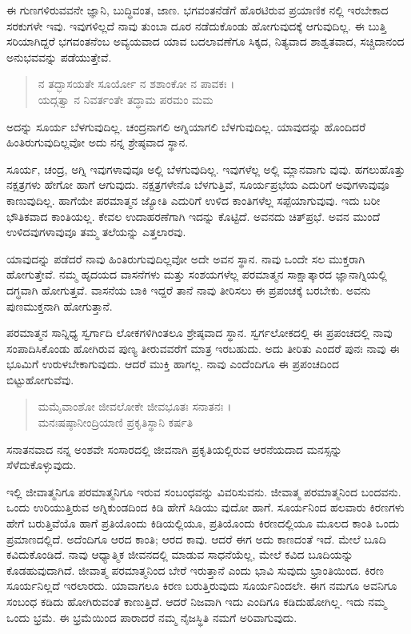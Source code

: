 ಈ ಗುಣಗಳಿರುವವನೇ ಜ್ಞಾನಿ, ಬುದ್ಧಿವಂತ, ಜಾಣ. ಭಗವಂತನೆಡೆಗೆ ಹೊರಟಿರುವ ಪ್ರಯಾಣಿಕ ನಲ್ಲಿ ಇರಬೇಕಾದ ಸರಕುಗಳೇ ಇವು. ಇವುಗಳಿಲ್ಲದೆ ನಾವು ತುಂಬಾ ದೂರ ನಡೆದುಕೊಂಡು ಹೋಗುವುದಕ್ಕೆ ಆಗುವುದಿಲ್ಲ. ಈ ಬುತ್ತಿ ಸರಿಯಾಗಿದ್ದರೆ ಭಗವಂತನೆಂಬ ಅವ್ಯಯವಾದ ಯಾವ ಬದಲಾವಣೆಗೂ ಸಿಕ್ಕದ, ನಿತ್ಯವಾದ ಶಾಶ್ವತವಾದ, ಸಚ್ಚಿದಾನಂದ ಅನುಭವವನ್ನು ಪಡೆಯುತ್ತೇವೆ.

\begin{verse}
ನ ತದ್ಭಾಸಯತೇ ಸೂರ್ಯೋ ನ ಶಶಾಂಕೋ ನ ಪಾವಕಃ ।\\ಯದ್ಗತ್ವಾ ನ ನಿವರ್ತಂತೇ ತದ್ಧಾಮ ಪರಮಂ ಮಮ 
\end{verse}

{\small ಅದನ್ನು ಸೂರ್ಯ ಬೆಳಗುವುದಿಲ್ಲ. ಚಂದ್ರನಾಗಲಿ ಅಗ್ನಿಯಾಗಲಿ ಬೆಳಗುವುದಿಲ್ಲ. ಯಾವುದನ್ನು ಹೊಂದಿದರೆ ಹಿಂತಿರುಗುವುದಿಲ್ಲವೋ ಅದು ನನ್ನ ಶ್ರೇಷ್ಠವಾದ ಸ್ಥಾನ.}

ಸೂರ್ಯ, ಚಂದ್ರ, ಅಗ್ನಿ ಇವುಗಳಾವುವೂ ಅಲ್ಲಿ ಬೆಳಗುವುದಿಲ್ಲ. ಇವುಗಳೆಲ್ಲ ಅಲ್ಲಿ ಮ್ಲಾನವಾಗು ವುವು. ಹಗಲುಹೊತ್ತು ನಕ್ಷತ್ರಗಳು ಹೇಗೋ ಹಾಗೆ ಆಗುವುದು. ನಕ್ಷತ್ರಗಳೇನೊ ಬೆಳಗುತ್ತಿವೆ, ಸೂರ್ಯಪ್ರಭೆಯ ಎದುರಿಗೆ ಅವುಗಳಾವುವೂ ಕಾಣುವುದಿಲ್ಲ. ಹಾಗೆಯೇ ಪರಮಾತ್ಮನ ಜ್ಯೋತಿ ಎದುರಿಗೆ ಉಳಿದ ಕಾಂತಿಗಳೆಲ್ಲ ಸಪ್ಪೆಯಾಗುವುವು. ಇದು ಬರೀ ಭೌತಿಕವಾದ ಕಾಂತಿಯಲ್ಲ. ಕೇವಲ ಉದಾಹರಣೆಗಾಗಿ ಇದನ್ನು ಕೊಟ್ಟಿದೆ. ಅವನದು ಚಿತ್​ಪ್ರಭೆ. ಅವನ ಮುಂದೆ ಉಳಿದವುಗಳಾವುವೂ ತಮ್ಮ ತಲೆಯನ್ನು ಎತ್ತಲಾರವು.

ಯಾವುದನ್ನು ಪಡೆದರೆ ನಾವು ಹಿಂತಿರುಗುವುದಿಲ್ಲವೋ ಅದೇ ಅವನ ಸ್ಥಾನ. ನಾವು ಒಂದೇ ಸಲ ಮುಕ್ತರಾಗಿ ಹೋಗುತ್ತೇವೆ. ನಮ್ಮ ಹೃದಯದ ವಾಸನೆಗಳು ಮತ್ತು ಸಂಶಯಗಳೆಲ್ಲ ಪರಮಾತ್ಮನ ಸಾಕ್ಷಾತ್ಕಾರದ ಜ್ಞಾನಾಗ್ನಿಯಲ್ಲಿ ದಗ್ಧವಾಗಿ ಹೋಗುತ್ತವೆ. ವಾಸನೆಯ ಬಾಕಿ ಇದ್ದರೆ ತಾನೆ ನಾವು ತೀರಿಸಲು ಈ ಪ್ರಪಂಚಕ್ಕೆ ಬರಬೇಕು. ಅವನು ಪುಣಮುಕ್ತನಾಗಿ ಹೋಗುತ್ತಾನೆ.

ಪರಮಾತ್ಮನ ಸಾನ್ನಿಧ್ಯ ಸ್ವರ್ಗಾದಿ ಲೋಕಗಳಿಗಿಂತಲೂ ಶ್ರೇಷ್ಠವಾದ ಸ್ಥಾನ. ಸ್ವರ್ಗಲೋಕದಲ್ಲಿ ಈ ಪ್ರಪಂಚದಲ್ಲಿ ನಾವು ಸಂಪಾದಿಸಿಕೊಂಡು ಹೋಗಿರುವ ಪುಣ್ಯ ತೀರುವವರೆಗೆ ಮಾತ್ರ ಇರಬಹುದು. ಅದು ತೀರಿತು ಎಂದರೆ ಪುನಃ ನಾವು ಈ ಭೂಮಿಗೆ ಉರುಳಬೇಕಾಗುವುದು. ಆದರೆ ಮುಕ್ತಿ ಹಾಗಲ್ಲ. ನಾವು ಎಂದೆಂದಿಗೂ ಈ ಪ್ರಪಂಚದಿಂದ ಬಿಟ್ಟುಹೋಗುವೆವು.

\begin{verse}
ಮಮೈವಾಂಶೋ ಜೀವಲೋಕೇ ಜೀವಭೂತಃ ಸನಾತನಃ ।\\ಮನಃಷಷ್ಠಾನೀಂದ್ರಿಯಾಣಿ ಪ್ರಕೃತಿಸ್ಥಾನಿ ಕರ್ಷತಿ 
\end{verse}

{\small ಸನಾತನವಾದ ನನ್ನ ಅಂಶವೇ ಸಂಸಾರದಲ್ಲಿ ಜೀವನಾಗಿ ಪ್ರಕೃತಿಯಲ್ಲಿರುವ ಆರನೆಯದಾದ ಮನಸ್ಸನ್ನು ಸೆಳೆದುಕೊಳ್ಳುವುದು.}

ಇಲ್ಲಿ ಜೀವಾತ್ಮನಿಗೂ ಪರಮಾತ್ಮನಿಗೂ ಇರುವ ಸಂಬಂಧವನ್ನು ವಿವರಿಸುವನು. ಜೀವಾತ್ಮ ಪರಮಾತ್ಮನಿಂದ ಬಂದವನು. ಒಂದು ಉರಿಯುತ್ತಿರುವ ಅಗ್ನಿಕುಂಡದಿಂದ ಕಿಡಿ ಹೇಗೆ ಸಿಡಿಯು ವುದೋ ಹಾಗೆ. ಸೂರ್ಯನಿಂದ ಹಲವಾರು ಕಿರಣಗಳು ಹೇಗೆ ಬರುತ್ತಿವೆಯೊ ಹಾಗೆ ಪ್ರತಿಯೊಂದು ಕಿಡಿಯಲ್ಲಿಯೂ, ಪ್ರತಿಯೊಂದು ಕಿರಣದಲ್ಲಿಯೂ ಮೂಲದ ಕಾಂತಿ ಒಂದು ಪ್ರಮಾಣದಲ್ಲಿದೆ. ಅದೆಂದಿಗೂ ಆರದ ಕಾಂತಿ; ಆರದ ಕಾವು. ಆದರೆ ಈಗ ಅದು ಕಾಣದಂತೆ ಇದೆ. ಮೇಲೆ ಬೂದಿ ಕವಿದುಕೊಂಡಿದೆ. ನಾವು ಆಧ್ಯಾತ್ಮಿಕ ಜೀವನದಲ್ಲಿ ಮಾಡುವ ಸಾಧನೆಯೆಲ್ಲ, ಮೇಲೆ ಕವಿದ ಬೂದಿಯನ್ನು ಕೊಡಹುವುದಾಗಿದೆ. ಜೀವಾತ್ಮ ಪರಮಾತ್ಮನಿಂದ ಬೇರೆ ಇರುತ್ತಾನೆ ಎಂದು ಭಾವಿ ಸುವುದು ಭ್ರಾಂತಿಯಿಂದ. ಕಿರಣ ಸೂರ್ಯನಿಲ್ಲದೆ ಇರಲಾರದು. ಯಾವಾಗಲೂ ಕಿರಣ ಬರುತ್ತಿರುವುದು ಸೂರ್ಯನಿಂದಲೇ. ಈಗ ನಮಗೂ ಅವನಿಗೂ ಸಂಬಂಧ ಕಡಿದು ಹೋಗಿರುವಂತೆ ಕಾಣುತ್ತಿದೆ. ಆದರೆ ನಿಜವಾಗಿ ಇದು ಎಂದಿಗೂ ಕಡಿದುಹೋಗಿಲ್ಲ. ಇದು ನಮ್ಮ ಒಂದು ಭ್ರಮೆ. ಈ ಭ್ರಮೆಯಿಂದ ಪಾರಾದರೆ ನಮ್ಮ ನೈಜಸ್ಥಿತಿ ನಮಗೆ ಅರಿವಾಗುವುದು.


